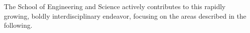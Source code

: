 The School of Engineering and Science actively contributes to this
rapidly growing, boldly interdisciplinary endeavor, focusing on the
areas described in the following.
%

